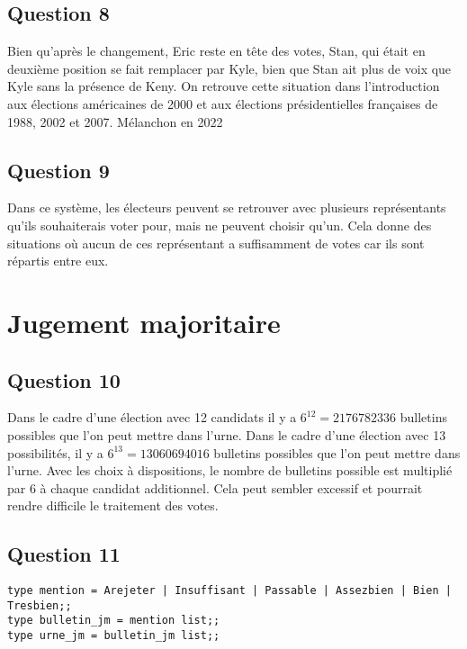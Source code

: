 \documentclass[french, 10pt, a4paper]{article}
\begin{document}
\subsection{Question 8}
Bien qu'après le changement, Eric reste en tête des votes, Stan, qui était en deuxième position se fait remplacer par Kyle, bien que Stan ait plus de voix que Kyle sans la présence de Keny. On retrouve cette situation dans l'introduction aux élections américaines de 2000 et aux élections présidentielles françaises de 1988, 2002 et 2007. Mélanchon en 2022



\subsection{Question 9}
Dans ce système, les électeurs peuvent se retrouver avec plusieurs représentants qu'ils souhaiterais voter pour, mais ne peuvent choisir qu'un. Cela donne des situations où aucun de ces représentant a suffisamment de votes car ils sont répartis entre eux.



\section{Jugement majoritaire}

\subsection{Question 10}

Dans le cadre d'une élection avec 12 candidats il y a $ 6^{12} = 2176782336 $ bulletins possibles que l'on peut mettre dans l'urne. Dans le cadre d’une élection avec 13 possibilités, il y a $ 6^{13} = 13060694016 $ bulletins possibles que l’on peut mettre dans l’urne. Avec les choix à dispositions, le nombre de bulletins possible est multiplié par 6 à chaque candidat additionnel. Cela peut sembler excessif et pourrait rendre difficile le traitement des votes.



\subsection{Question 11}

\begin{verbatim}
type mention = Arejeter | Insuffisant | Passable | Assezbien | Bien | Tresbien;;
type bulletin_jm = mention list;;
type urne_jm = bulletin_jm list;;
\end{verbatim}
\end{document}
